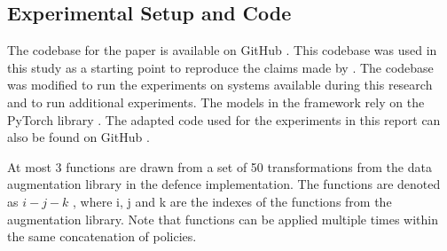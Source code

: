 



\subsection{Experimental Setup and Code}\label{sect:experiments}

The codebase for the paper is available on GitHub \cite{weigithub}. This codebase was used in this study as a starting point to reproduce the claims made by \citeauthor{gao2021privacy}. The codebase was modified to run the experiments on systems available during this research and to run additional experiments. The models in the framework rely on the PyTorch library \cite{NEURIPS2019_9015}. The adapted code used for the experiments in this report can also be found on GitHub \cite{reproduced}. %


At most 3 functions are drawn from a set of 50 transformations from the data augmentation library in the defence implementation. The functions are denoted as $i-j-k$ , where i, j and k are the indexes of the functions from the augmentation library. Note that functions can be applied multiple times within the same concatenation of policies.

